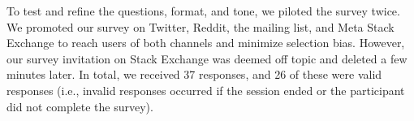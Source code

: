 To test and refine the questions, format, and tone, we piloted the survey twice. 
We promoted our survey on Twitter, Reddit, the \RH mailing list, and Meta Stack Exchange to reach users of both channels and minimize selection bias. However, our survey invitation on Stack Exchange was deemed off topic and deleted a few minutes later. In total, we received 37 responses, and 26 of these were valid responses (i.e., invalid responses occurred if the session ended or the participant did not complete the survey).

